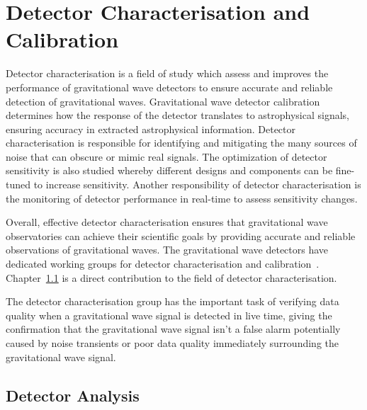 \section{\label{3:sec:detchar_calib}Detector Characterisation and Calibration}

Detector characterisation is a field of study which assess and improves the performance of gravitational wave detectors to ensure accurate and reliable detection of gravitational waves. Gravitational wave detector calibration determines how the response of the detector translates to astrophysical signals, ensuring accuracy in extracted astrophysical information. Detector characterisation is responsible for identifying and mitigating the many sources of noise that can obscure or mimic real signals. The optimization of detector sensitivity is also studied whereby different designs and components can be fine-tuned to increase sensitivity. Another responsibility of detector characterisation is the monitoring of detector performance in real-time to assess sensitivity changes.

Overall, effective detector characterisation ensures that gravitational wave observatories can achieve their scientific goals by providing accurate and reliable observations of gravitational waves. The gravitational wave detectors have dedicated working groups for detector characterisation and calibration~\cite{O2O3_DetChar:2021, VirgoDetChar:2023}. Chapter~\ref{} is a direct contribution to the field of detector characterisation.

The detector characterisation group has the important task of verifying data quality when a gravitational wave signal is detected in live time, giving the confirmation that the gravitational wave signal isn't a false alarm potentially caused by noise transients or poor data quality immediately surrounding the gravitational wave signal.

\subsection{\label{3:sec:detector-analysis}Detector Analysis}


